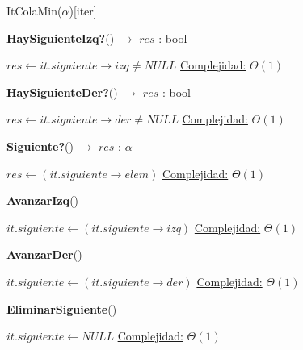 \begin{Estructura}{ItColaMin($\alpha$)}[iter]
\begin{algorithm}[H]{\textbf{HaySiguienteIzq?}() $\to$ $res$ : bool}
   	\begin{algorithmic}[1]
			\State $res \gets it.siguiente \rightarrow izq \neq NULL $ 
			\Statex \underline{Complejidad:} $\Theta(1)$
   	\end{algorithmic}
\end{algorithm}  

\begin{algorithm}[H]{\textbf{HaySiguienteDer?}() $\to$ $res$ : bool}
   	\begin{algorithmic}[1]
			\State $res \gets it.siguiente \rightarrow der \neq NULL $ 
			\Statex \underline{Complejidad:} $\Theta(1)$
   	\end{algorithmic}
\end{algorithm}

\begin{algorithm}[H]{\textbf{Siguiente?}() $\to$ $res$ : $\alpha$}
   	\begin{algorithmic}[1]
			\State $res \gets (it.siguiente \rightarrow elem) $ 
			\Statex \underline{Complejidad:} $\Theta(1)$
   	\end{algorithmic}
\end{algorithm}

\begin{algorithm}[H]{\textbf{AvanzarIzq}()}
   	\begin{algorithmic}[1]
			\State $it.siguiente \gets (it.siguiente \rightarrow izq) $ 
			\Statex \underline{Complejidad:} $\Theta(1)$
   	\end{algorithmic}
\end{algorithm}

\begin{algorithm}[H]{\textbf{AvanzarDer}()}
   	\begin{algorithmic}[1]
			\State $it.siguiente \gets (it.siguiente \rightarrow der) $ 
			\Statex \underline{Complejidad:} $\Theta(1)$
   	\end{algorithmic}
\end{algorithm}

\begin{algorithm}[H]{\textbf{EliminarSiguiente}()}
   	\begin{algorithmic}[1]
			\State $it.siguiente \gets NULL $ 
			\Statex \underline{Complejidad:} $\Theta(1)$
   	\end{algorithmic}
\end{algorithm}


\end{Estructura}
